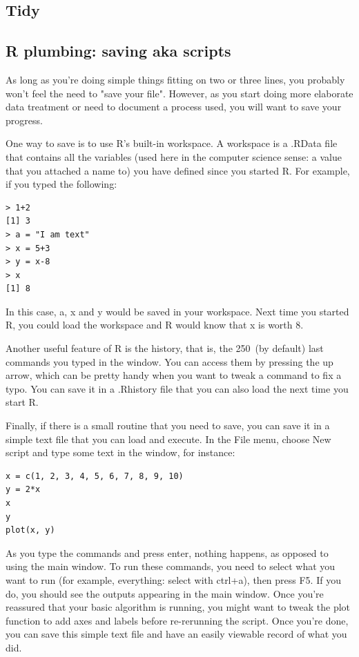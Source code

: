 \documentclass{report}
\newcommand{\code}[1]{\textsf{\ttfamily #1}}
\begin{document}
		\subsection{Tidy}
		
		\subsection{R plumbing: saving aka scripts}
		As long as you're doing simple things fitting on two or three lines, you probably won't feel the need to "save your file". However, as you start doing more elaborate data treatment or need to document a process used, you will want to save your progress.
		
		One way to save is to use R's built-in \code{workspace}. A \code{workspace} is a \code{.RData} file that contains all the variables (used here in the computer science sense: a value that you attached a name to) you have defined since you started R. For example, if you typed the following:
		\begin{verbatim}
> 1+2
[1] 3
> a = "I am text"
> x = 5+3
> y = x-8
> x
[1] 8
		\end{verbatim}
		In this case, \code{a}, \code{x} and \code{y} would be saved in your workspace. Next time you started R, you could load the \code{workspace} and R would know that x is worth 8.
		
		Another useful feature of R is the history, that is, the 250~(by default) last commands you typed in the window. You can access them by pressing the up arrow, which can be pretty handy when you want to tweak a command to fix a typo. You can save it in a \code{.Rhistory} file that you can also load the next time you start R.
		
		Finally, if there is a small routine that you need to save, you can save it in a simple text file that you can load and execute. In the \code{File} menu, choose \code{New script} and type some text in the window, for instance:
		\begin{verbatim}
x = c(1, 2, 3, 4, 5, 6, 7, 8, 9, 10)
y = 2*x
x
y
plot(x, y)
		\end{verbatim}
		As you type the commands and press enter, nothing happens, as opposed to using the main window. To run these commands, you need to select what you want to run (for example, everything: select with ctrl+a), then press F5. If you do, you should see the outputs appearing in the main window. Once you're reassured that your basic algorithm is running, you might want to tweak the plot function to add axes and labels before re-rerunning the script. Once you're done, you can save this simple text file and have an easily viewable record of what you did.
\end{document}
